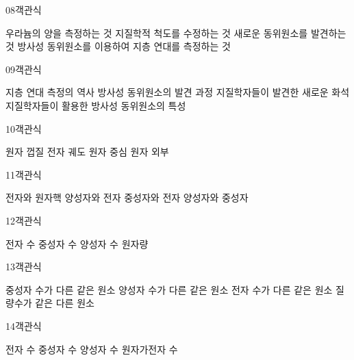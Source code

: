 \documentclass[fs9,seriesRus]{korfarm-base}
\begin{document}
\begin{kfQBlock}{08}{객관식}
\begin{kfChoices}
\kfChoice 우라늄의 양을 측정하는 것
\kfChoice 지질학적 척도를 수정하는 것
\kfChoice 새로운 동위원소를 발견하는 것
\kfChoice 방사성 동위원소를 이용하여 지층 연대를 측정하는 것
\end{kfChoices}
\end{kfQBlock}
\begin{kfQBlock}{09}{객관식}
\begin{kfChoices}
\kfChoice 지층 연대 측정의 역사
\kfChoice 방사성 동위원소의 발견 과정
\kfChoice 지질학자들이 발견한 새로운 화석
\kfChoice 지질학자들이 활용한 방사성 동위원소의 특성
\end{kfChoices}
\end{kfQBlock}
\begin{kfQBlock}{10}{객관식}
\begin{kfChoices}
\kfChoice 원자 껍질
\kfChoice 전자 궤도
\kfChoice 원자 중심
\kfChoice 원자 외부
\end{kfChoices}
\end{kfQBlock}
\begin{kfQBlock}{11}{객관식}
\begin{kfChoices}
\kfChoice 전자와 원자핵
\kfChoice 양성자와 전자
\kfChoice 중성자와 전자
\kfChoice 양성자와 중성자
\end{kfChoices}
\end{kfQBlock}
\begin{kfQBlock}{12}{객관식}
\begin{kfChoices}
\kfChoice 전자 수
\kfChoice 중성자 수
\kfChoice 양성자 수
\kfChoice 원자량
\end{kfChoices}
\end{kfQBlock}
\begin{kfQBlock}{13}{객관식}
\begin{kfChoices}
\kfChoice 중성자 수가 다른 같은 원소
\kfChoice 양성자 수가 다른 같은 원소
\kfChoice 전자 수가 다른 같은 원소
\kfChoice 질량수가 같은 다른 원소
\end{kfChoices}
\end{kfQBlock}
\begin{kfQBlock}{14}{객관식}
\begin{kfChoices}
\kfChoice 전자 수
\kfChoice 중성자 수
\kfChoice 양성자 수
\kfChoice 원자가전자 수
\end{kfChoices}
\end{kfQBlock}
\end{document}
